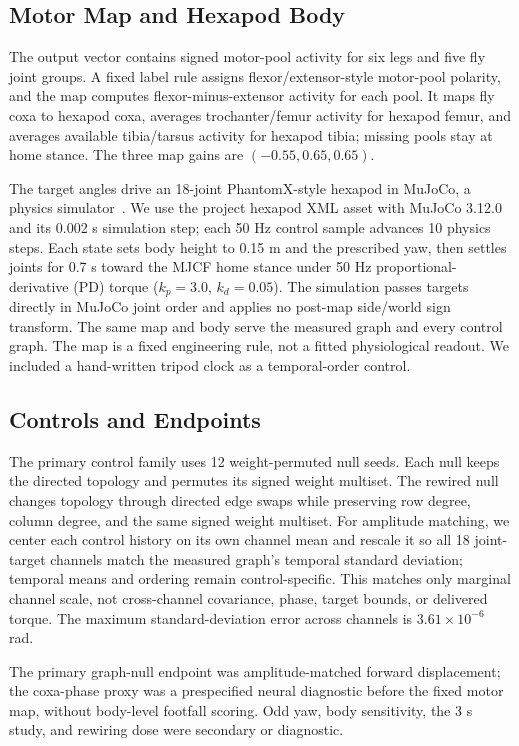 \documentclass[conference]{IEEEtran}
\begin{document}
\subsection{Motor Map and Hexapod Body}
The output vector contains signed motor-pool activity for six legs and five fly joint groups. A fixed label rule assigns flexor/extensor-style motor-pool polarity, and the map computes flexor-minus-extensor activity for each pool. It maps fly coxa to hexapod coxa, averages trochanter/femur activity for hexapod femur, and averages available tibia/tarsus activity for hexapod tibia; missing pools stay at home stance. The three map gains are $(-0.55,0.65,0.65)$.

The target angles drive an 18-joint PhantomX-style hexapod in MuJoCo, a physics simulator~\cite{todorov2012mujoco}. We use the project hexapod XML asset with MuJoCo 3.12.0 and its 0.002 s simulation step; each 50 Hz control sample advances 10 physics steps. Each state sets body height to 0.15 m and the prescribed yaw, then settles joints for 0.7 s toward the MJCF home stance under 50 Hz proportional-derivative (PD) torque ($k_p=3.0$, $k_d=0.05$). The simulation passes targets directly in MuJoCo joint order and applies no post-map side/world sign transform. The same map and body serve the measured graph and every control graph. The map is a fixed engineering rule, not a fitted physiological readout. We included a hand-written tripod clock as a temporal-order control.

\subsection{Controls and Endpoints}
The primary control family uses 12 weight-permuted null seeds. Each null keeps the directed topology and permutes its signed weight multiset. The rewired null changes topology through directed edge swaps while preserving row degree, column degree, and the same signed weight multiset. For amplitude matching, we center each control history on its own channel mean and rescale it so all 18 joint-target channels match the measured graph's temporal standard deviation; temporal means and ordering remain control-specific. This matches only marginal channel scale, not cross-channel covariance, phase, target bounds, or delivered torque. The maximum standard-deviation error across channels is $3.61\times10^{-6}$ rad.

The primary graph-null endpoint was amplitude-matched forward displacement; the coxa-phase proxy was a prespecified neural diagnostic before the fixed motor map, without body-level footfall scoring. Odd yaw, body sensitivity, the 3 s study, and rewiring dose were secondary or diagnostic.
\end{document}
